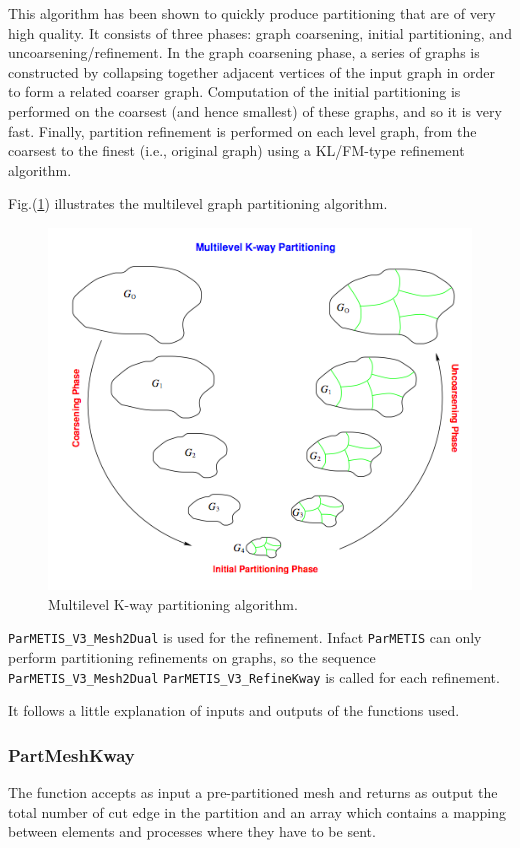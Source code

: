 This algorithm has been shown to quickly produce partitioning that are of very high quality. It consists of three phases: graph coarsening, initial partitioning, and uncoarsening/refinement. In the graph coarsening phase, a series of graphs is constructed by collapsing together adjacent vertices of the input graph in order to form a related coarser graph. Computation of the initial partitioning is performed on the coarsest (and hence smallest) of these graphs, and so it is very fast. Finally, partition refinement is performed on each level graph, from the coarsest to the finest (i.e., original graph) using a KL/FM-type refinement algorithm.

Fig.(\ref{fig:parmetis_algorithm}) illustrates the multilevel graph partitioning algorithm.

\begin{figure}
\centering
\includegraphics[scale=.45]{images/parmetis_algorithm.png}
\caption{Multilevel K-way partitioning algorithm.}
\label{fig:parmetis_algorithm}
\end{figure}

\verb|ParMETIS_V3_Mesh2Dual| is  used for the refinement. Infact \verb|ParMETIS| can only perform partitioning refinements on graphs, so the sequence \verb|ParMETIS_V3_Mesh2Dual| \verb|ParMETIS_V3_RefineKway| is called for each refinement.

It follows a little explanation of inputs and outputs of the functions used.

\subsubsection{PartMeshKway}\label{subsubsection:partmeshkway}
The function accepts as input a pre-partitioned mesh and returns as output the total number of cut edge in the partition and an array which contains a mapping between elements and processes where they have to be sent.

